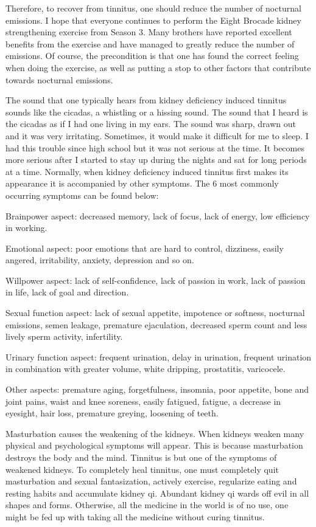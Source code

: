 \documentclass[
]{book}
\begin{document}
Therefore, to recover from tinnitus, one should reduce the number of nocturnal emissions. I hope that everyone continues to perform the Eight Brocade kidney strengthening exercise from Season 3. Many brothers have reported excellent benefits from the exercise and have managed to greatly reduce the number of emissions. Of course, the precondition is that one has found the correct feeling when doing the exercise, as well as putting a stop to other factors that contribute towards nocturnal emissions.

The sound that one typically hears from kidney deficiency induced tinnitus sounds like the cicadas, a whistling or a hissing sound. The sound that I heard is the cicadas as if I had one living in my ears. The sound was sharp, drawn out and it was very irritating. Sometimes, it would make it difficult for me to sleep. I had this trouble since high school but it was not serious at the time. It becomes more serious after I started to stay up during the nights and sat for long periods at a time. Normally, when kidney deficiency induced tinnitus first makes its appearance it is accompanied by other symptoms. The 6 most commonly occurring symptoms can be found below:

Brainpower aspect: decreased memory, lack of focus, lack of energy, low efficiency in working.

Emotional aspect: poor emotions that are hard to control, dizziness, easily angered, irritability, anxiety, depression and so on.

Willpower aspect: lack of self-confidence, lack of passion in work, lack of passion in life, lack of goal and direction.

Sexual function aspect: lack of sexual appetite, impotence or softness, nocturnal emissions, semen leakage, premature ejaculation, decreased sperm count and less lively sperm activity, infertility.

Urinary function aspect: frequent urination, delay in urination, frequent urination in combination with greater volume, white dripping, prostatitis, varicocele.

Other aspects: premature aging, forgetfulness, insomnia, poor appetite, bone and joint pains, waist and knee soreness, easily fatigued, fatigue, a decrease in eyesight, hair loss, premature greying, loosening of teeth.

Masturbation causes the weakening of the kidneys. When kidneys weaken many physical and psychological symptoms will appear. This is because masturbation destroys the body and the mind. Tinnitus is but one of the symptoms of weakened kidneys. To completely heal tinnitus, one must completely quit masturbation and sexual fantasization, actively exercise, regularize eating and resting habits and accumulate kidney qi. Abundant kidney qi wards off evil in all shapes and forms. Otherwise, all the medicine in the world is of no use, one might be fed up with taking all the medicine without curing tinnitus.
\end{document}
